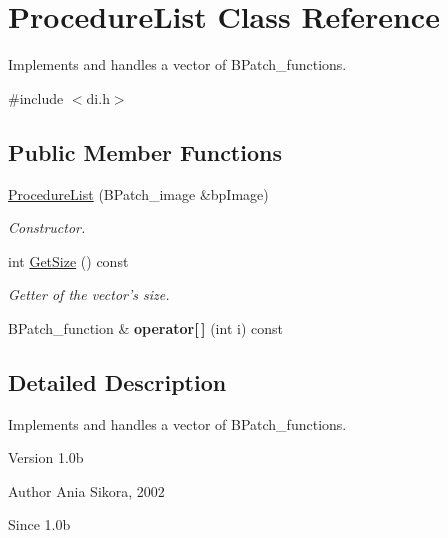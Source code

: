 \hypertarget{class_procedure_list}{\section{Procedure\-List Class Reference}
\label{class_procedure_list}
}


Implements and handles a vector of B\-Patch\-\_\-functions.  




{\ttfamily \#include $<$di.\-h$>$}

\subsection*{Public Member Functions}
\begin{DoxyCompactItemize}
\item 
\hyperlink{class_procedure_list_a21b30b5349812a669625177fb7efc224}{Procedure\-List} (B\-Patch\-\_\-image \&bp\-Image)
\begin{DoxyCompactList}\small\item\em Constructor. \end{DoxyCompactList}\item 
int \hyperlink{class_procedure_list_a0b3c110b1b4c1f15968c618a10a3c82c}{Get\-Size} () const 
\begin{DoxyCompactList}\small\item\em Getter of the vector's size. \end{DoxyCompactList}\item 
\hypertarget{class_procedure_list_a73da6b29354ed6d011e0f31ec7e48d5d}{B\-Patch\-\_\-function \& {\bfseries operator\mbox{[}$\,$\mbox{]}} (int i) const }\label{class_procedure_list_a73da6b29354ed6d011e0f31ec7e48d5d}

\end{DoxyCompactItemize}


\subsection{Detailed Description}
Implements and handles a vector of B\-Patch\-\_\-functions. 

\begin{DoxyVersion}{Version}
1.\-0b 
\end{DoxyVersion}
\begin{DoxyAuthor}{Author}
Ania Sikora, 2002 
\end{DoxyAuthor}
\begin{DoxySince}{Since}
1.\-0b 
\end{DoxySince}


